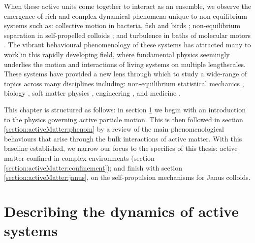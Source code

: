 When these active units come together to interact as an ensemble, we observe the emergence of rich and complex dynamical phenomena unique to non-equilibrium systems such as: collective motion in bacteria, fish and birds \cite{vicsek2012}; non-equilibrium separation in self-propelled colloids \cite{cates2015}; and turbulence in baths of molecular motors \cite{doostmohammadi2018}. 
The vibrant behavioural phenomenology of these systems has attracted many to work in this rapidly developing field, where fundamental physics seemingly underlies the motion and interactions of living systems on multiple lengthscales. These systems have provided a new lens through which to study a wide-range of topics across many disciplines including: non-equilibrium statistical mechanics \cite{cates2012,ramaswamy2017}, biology \cite{viswanathan2011}, soft matter physics \cite{marchetti2013,bechinger2016a}, engineering \cite{brambilla2013}, and medicine \cite{wang2012,tarantola2019}.

This chapter is structured as follows: in section \ref{section:activeMatter:models} we begin with an introduction to the physics governing active particle motion. This is then followed in section \ref{section:activeMatter:phenom} by a review of the main phenomenological behaviours that arise through the bulk interactions of active matter. With this baseline established, we narrow our focus to the specifics of this thesis: active matter confined in complex environments (section \ref{section:activeMatter:confinement}); and finish with section \ref{section:activeMatter:janus}, on the self-propulsion mechanisms for Janus colloids.


\section{Describing the dynamics of active systems}
\label{section:activeMatter:models}

